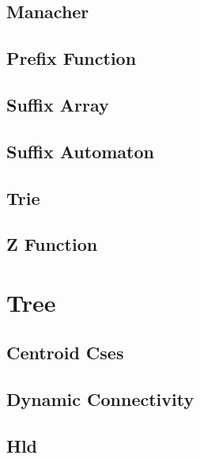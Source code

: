 \documentclass[10pt,portrait,twocolumn,a4paper,notitlepage]{article}
\newcommand\cppfile[2][]{%
\ifstrempty{#1}{}{}%
}
\begin{document}
\subsection{Manacher}
\cppfile{strings_clean/manacher.cpp}

\subsection{Prefix Function}
\cppfile{strings_clean/prefix_function.cpp}

\subsection{Suffix Array}
\cppfile{strings_clean/suffix_array.cpp}

\subsection{Suffix Automaton}
\cppfile{strings_clean/suffix_automaton.cpp}

\subsection{Trie}
\cppfile{strings_clean/trie.cpp}

\subsection{Z Function}
\cppfile{strings_clean/z_function.cpp}


\section{Tree}

\subsection{Centroid Cses}
\cppfile{tree_clean/centroid_cses.cpp}

\subsection{Dynamic Connectivity}
\cppfile{tree_clean/dynamic_connectivity.cpp}

\subsection{Hld}
\cppfile{tree_clean/hld.cpp}
\end{document}
